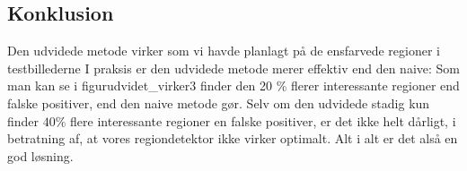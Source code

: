 \subsection{Konklusion}
Den udvidede metode virker som vi havde planlagt på de ensfarvede
regioner i testbillederne I praksis er den udvidede metode merer
effektiv end den naive: Som man kan se i figur{udvidet_virker3} finder
den 20 \% flerer interessante regioner end falske positiver, end den
naive metode gør. Selv om den udvidede stadig kun finder $40\%$ flere
interessante regioner en falske positiver, er det ikke helt dårligt, i
betratning af, at vores regiondetektor ikke virker optimalt. Alt i alt
er det alså en god løsning.
